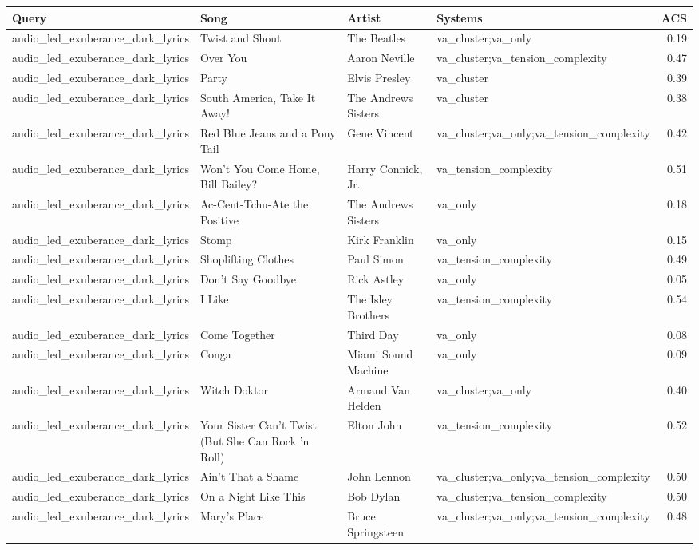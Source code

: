 \begin{tabular}{llllr}
Query & Song & Artist & Systems & ACS \\
\hline
audio\_led\_exuberance\_dark\_lyrics & Twist and Shout & The Beatles & va\_cluster;va\_only & 0.19 \\
audio\_led\_exuberance\_dark\_lyrics & Over You & Aaron Neville & va\_cluster;va\_tension\_complexity & 0.47 \\
audio\_led\_exuberance\_dark\_lyrics & Party & Elvis Presley & va\_cluster & 0.39 \\
audio\_led\_exuberance\_dark\_lyrics & South America, Take It Away! & The Andrews Sisters & va\_cluster & 0.38 \\
audio\_led\_exuberance\_dark\_lyrics & Red Blue Jeans and a Pony Tail & Gene Vincent & va\_cluster;va\_only;va\_tension\_complexity & 0.42 \\
audio\_led\_exuberance\_dark\_lyrics & Won't You Come Home, Bill Bailey? & Harry Connick, Jr. & va\_tension\_complexity & 0.51 \\
audio\_led\_exuberance\_dark\_lyrics & Ac-Cent-Tchu-Ate the Positive & The Andrews Sisters & va\_only & 0.18 \\
audio\_led\_exuberance\_dark\_lyrics & Stomp & Kirk Franklin & va\_only & 0.15 \\
audio\_led\_exuberance\_dark\_lyrics & Shoplifting Clothes & Paul Simon & va\_tension\_complexity & 0.49 \\
audio\_led\_exuberance\_dark\_lyrics & Don't Say Goodbye & Rick Astley & va\_only & 0.05 \\
audio\_led\_exuberance\_dark\_lyrics & I Like & The Isley Brothers & va\_tension\_complexity & 0.54 \\
audio\_led\_exuberance\_dark\_lyrics & Come Together & Third Day & va\_only & 0.08 \\
audio\_led\_exuberance\_dark\_lyrics & Conga & Miami Sound Machine & va\_only & 0.09 \\
audio\_led\_exuberance\_dark\_lyrics & Witch Doktor & Armand Van Helden & va\_cluster;va\_only & 0.40 \\
audio\_led\_exuberance\_dark\_lyrics & Your Sister Can't Twist (But She Can Rock 'n Roll) & Elton John & va\_tension\_complexity & 0.52 \\
audio\_led\_exuberance\_dark\_lyrics & Ain't That a Shame & John Lennon & va\_cluster;va\_only;va\_tension\_complexity & 0.50 \\
audio\_led\_exuberance\_dark\_lyrics & On a Night Like This & Bob Dylan & va\_cluster;va\_tension\_complexity & 0.50 \\
audio\_led\_exuberance\_dark\_lyrics & Mary's Place & Bruce Springsteen & va\_cluster;va\_only;va\_tension\_complexity & 0.48 \\
\end{tabular}
